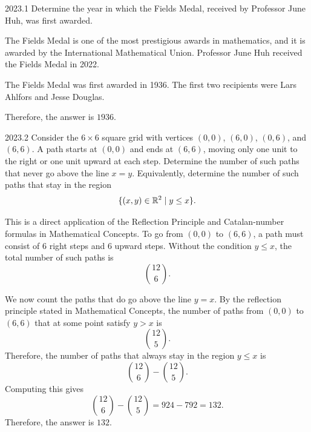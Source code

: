     \begin{pastproblem}{2023.1}
        Determine the year in which the Fields Medal, received by Professor June Huh, was first
        awarded.
    \end{pastproblem}

    \begin{solution}
        The Fields Medal is one of the most prestigious awards in mathematics, and it is awarded by
        the International Mathematical Union. Professor June Huh received the Fields Medal in 2022.

        The Fields Medal was first awarded in 1936. The first two recipients were Lars Ahlfors and
        Jesse Douglas.

        Therefore, the answer is $\boxed{1936}$.
    \end{solution}

    \begin{pastproblem}{2023.2}
        Consider the $6\times 6$ square grid with vertices $(0,0)$, $(6,0)$, $(0,6)$, and $(6,6)$. A
        path starts at $(0,0)$ and ends at $(6,6)$, moving only one unit to the right or one unit
        upward at each step. Determine the number of such paths that never go above the line $x=y$.
        Equivalently, determine the number of such paths that stay in the region
        \[
            \{(x,y)\in\mathbb{R}^2\mid y\leq x\}.
        \]
    \end{pastproblem}

    \begin{solution}
        This is a direct application of the Reflection Principle and Catalan-number
        formulas in Mathematical Concepts. To go from $(0,0)$ to $(6,6)$, a path must consist of $6$ right steps and $6$ upward steps.
        Without the condition $y\leq x$, the total number of such paths is
        \[
            \binom{12}{6}.
        \]

        We now count the paths that do go above the line $y=x$. By the reflection principle stated in Mathematical Concepts, the
        number of paths from $(0,0)$ to $(6,6)$ that at some point satisfy $y>x$ is
        \[
            \binom{12}{5}.
        \]
        Therefore, the number of paths that always stay in the region $y\leq x$ is
        \[
            \binom{12}{6}-\binom{12}{5}.
        \]
        Computing this gives
        \[
            \binom{12}{6}-\binom{12}{5}
            =
            924-792
            =
            132.
        \]
        Therefore, the answer is $\boxed{132}$.
    \end{solution}

